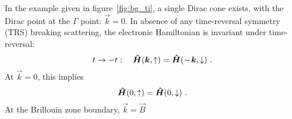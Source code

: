 In the example given in figure~\ref{fig:bg_ti}, a single Dirac cone exists, with the Dirac point at the $\Gamma$ point: $\vec{k} = 0$. In absence of any time-reversal symmetry (TRS) breaking scattering, the electronic Hamiltonian is invariant under time-reversal:%
\begin{equation}%
    t \to -t: \quad \op{H}(\vec{k}, \uparrow) = \op{H}(\vec{-k}, \downarrow)~.\label{eq:trs}%
\end{equation}%
At $\vec{k}=0$, this implies%
\begin{equation}%
    \op{H}(0, \uparrow) = \op{H}(0, \downarrow)~.%
\end{equation}%
At the Brillouin zone boundary, $\vec{k} = \vec{B}$
